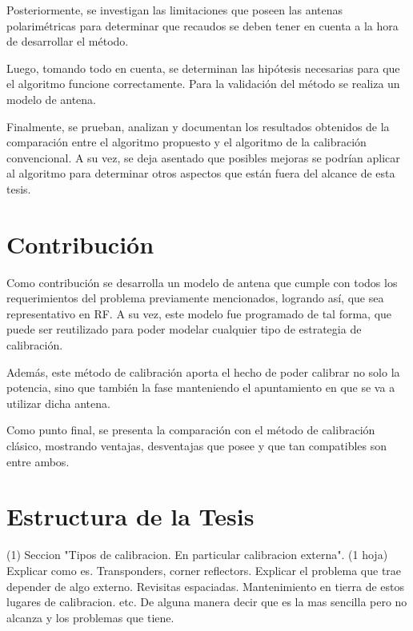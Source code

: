 Posteriormente, se investigan las limitaciones que poseen las antenas polarimétricas para determinar que recaudos 
se deben tener en cuenta a la hora de desarrollar el método.

Luego, tomando todo en cuenta, se determinan las hipótesis necesarias para que el algoritmo funcione correctamente. Para 
la validación del método se realiza un modelo de antena.

Finalmente, se prueban, analizan y documentan los resultados obtenidos de la comparación entre el algoritmo propuesto 
y el algoritmo de la calibración convencional. A su vez, se deja asentado que posibles mejoras se podrían aplicar al 
algoritmo para determinar otros aspectos que están fuera del alcance de esta tesis.

\section{Contribución}

Como contribución se desarrolla un modelo de antena que cumple con todos los requerimientos del problema previamente 
mencionados, logrando así, que sea representativo en RF. A su vez, este modelo fue programado de tal forma, que puede
ser reutilizado para poder modelar cualquier tipo de estrategia de calibración.

Además, este método de calibración aporta el hecho de poder calibrar no solo la potencia, sino que también la fase 
manteniendo el apuntamiento en que se va a utilizar dicha antena.

Como punto final, se presenta la comparación con el método de calibración clásico, mostrando ventajas, desventajas 
que posee y que tan compatibles son entre ambos.


\section{Estructura de la Tesis}

 (1) Seccion "Tipos de calibracion. En particular calibracion externa". (1 hoja)
 Explicar como es. Transponders, corner reflectors. Explicar el problema que trae depender de algo externo. Revisitas espaciadas. Mantenimiento en tierra de estos lugares de calibracion. etc.
 De alguna manera decir que es la mas sencilla pero no alcanza y los problemas que tiene.

